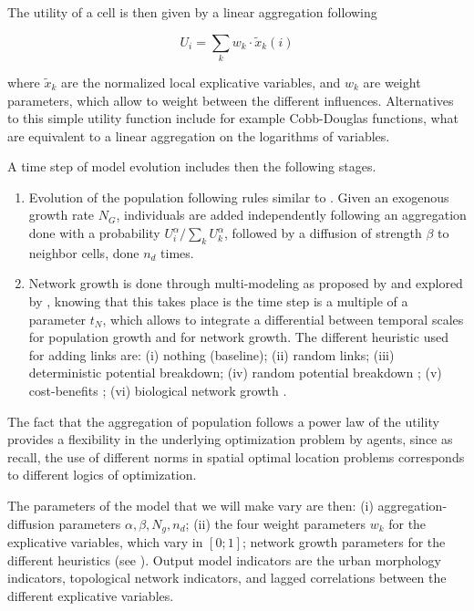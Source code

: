 \documentclass[11pt]{article}
\begin{document}
The utility of a cell is then given by a linear aggregation following

\begin{equation}
U_i = \sum_k w_k \cdot \tilde{x}_k(i)
\end{equation}

where $\tilde{x}_k$ are the normalized local explicative variables, and $w_k$ are weight parameters, which allow to weight between the different influences. Alternatives to this simple utility function include for example Cobb-Douglas functions, what are equivalent to a linear aggregation on the logarithms of variables.


A time step of model evolution includes then the following stages.
\begin{enumerate}
	\item Evolution of the population following rules similar to \cite{2017arXiv170806743R}. Given an exogenous growth rate $N_G$, individuals are added independently following an aggregation done with a probability $U_i^\alpha/\sum_k U_k^\alpha$, followed by a diffusion of strength $\beta$ to neighbor cells, done $n_d$ times.
	\item Network growth is done through multi-modeling as proposed by \cite{raimbault2017modeling} and explored by \cite{raimbault2018multi}, knowing that this takes place is the time step is a multiple of a parameter $t_N$, which allows to integrate a differential between temporal scales for population growth and for network growth. The different heuristic used for adding links are: (i) nothing (baseline); (ii) random links; (iii) deterministic potential breakdown; (iv) random potential breakdown \citep{schmitt2014modelisation}; (v) cost-benefits \citep{louf2013emergence}; (vi) biological network growth \citep{tero2010rules}.
\end{enumerate}



The fact that the aggregation of population follows a power law of the utility provides a flexibility in the underlying optimization problem by agents, since as \cite{josselin2013revisiting} recall, the use of different norms in spatial optimal location problems corresponds to different logics of optimization.



The parameters of the model that we will make vary are then: (i) aggregation-diffusion parameters $\alpha,\beta,N_g,n_d$; (ii) the four weight parameters $w_k$ for the explicative variables, which vary in $[0;1]$; network growth parameters for the different heuristics (see \cite{raimbault2018multi}). Output model indicators are the urban morphology indicators, topological network indicators, and lagged correlations between the different explicative variables.
\end{document}
